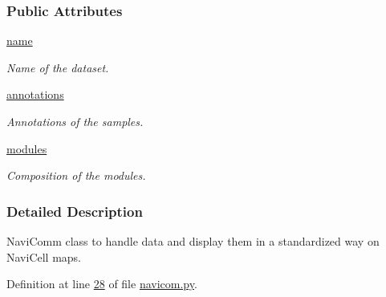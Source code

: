 \subsubsection*{Public Attributes}
\begin{DoxyCompactItemize}
\item 
\hypertarget{classnavicom_1_1navicom_1_1NaviCom_a950e5ebf199edea40d55c506b8aaf134}{
\hyperlink{classnavicom_1_1navicom_1_1NaviCom_a950e5ebf199edea40d55c506b8aaf134}{name}}
\label{classnavicom_1_1navicom_1_1NaviCom_a950e5ebf199edea40d55c506b8aaf134}

\begin{DoxyCompactList}\small\item\em Name of the dataset. \item\end{DoxyCompactList}\item 
\hypertarget{classnavicom_1_1navicom_1_1NaviCom_a0386d881214943cf3432d0ffe22cbb71}{
\hyperlink{classnavicom_1_1navicom_1_1NaviCom_a0386d881214943cf3432d0ffe22cbb71}{annotations}}
\label{classnavicom_1_1navicom_1_1NaviCom_a0386d881214943cf3432d0ffe22cbb71}

\begin{DoxyCompactList}\small\item\em Annotations of the samples. \item\end{DoxyCompactList}\item 
\hypertarget{classnavicom_1_1navicom_1_1NaviCom_a56141660ddf29a36a8291e938246578c}{
\hyperlink{classnavicom_1_1navicom_1_1NaviCom_a56141660ddf29a36a8291e938246578c}{modules}}
\label{classnavicom_1_1navicom_1_1NaviCom_a56141660ddf29a36a8291e938246578c}

\begin{DoxyCompactList}\small\item\em Composition of the modules. \item\end{DoxyCompactList}\end{DoxyCompactItemize}


\subsubsection{Detailed Description}
NaviComm class to handle data and display them in a standardized way on NaviCell maps. 

Definition at line \hyperlink{navicom_8py_source_l00028}{28} of file \hyperlink{navicom_8py_source}{navicom.py}.



